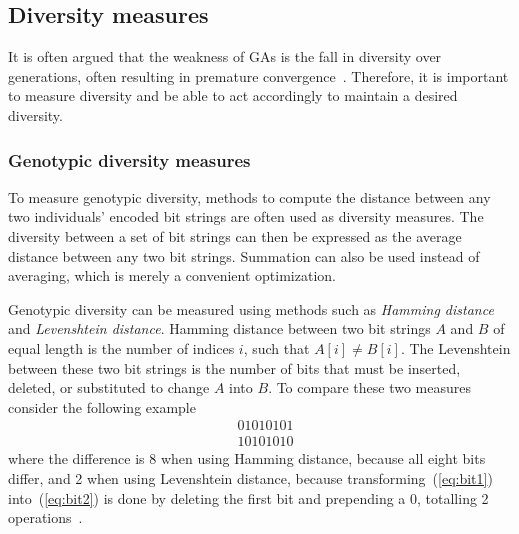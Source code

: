\subsection{Diversity measures}
\label{sec:diversitymeasures}
It is often argued that the weakness of GAs is the fall in diversity over generations, often resulting in premature convergence~\cite{diaz2007empirical, 1266373,Zitzler00comparisonof}. Therefore, it is important to measure diversity and be able to act accordingly to maintain a desired diversity.

\subsubsection{Genotypic diversity measures}
To measure genotypic diversity, methods to compute the distance between any two individuals' encoded bit strings are often used as diversity measures. The diversity between a set of bit strings can then be expressed as the average distance between any two bit strings. Summation can also be used instead of averaging, which is merely a convenient optimization.

Genotypic diversity can be measured using methods such as \emph{Hamming distance} and \emph{Levenshtein distance}. Hamming distance between two bit strings $A$ and $B$ of equal length is the number of indices $i$, such that $A[i] \neq B[i]$. The Levenshtein between these two bit strings is the number of bits that must be inserted, deleted, or substituted to change $A$ into $B$. To compare these two measures consider the following example 
%
\begin{align}
  &01010101\label{eq:bit1} \\
  &10101010\label{eq:bit2}
\end{align}
%
where the difference is 8 when using Hamming distance, because all eight bits differ, and 2 when using Levenshtein distance, because transforming~(\ref{eq:bit1}) into~(\ref{eq:bit2}) is done by deleting the first bit and prepending a $0$, totalling 2 operations~\cite{1250187}.

